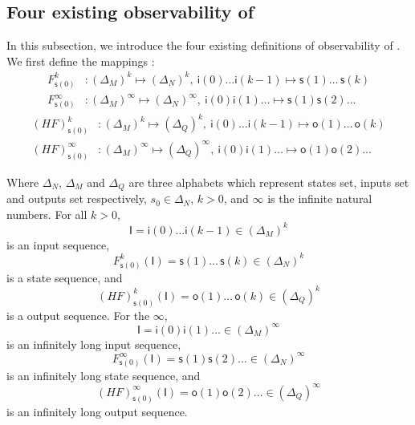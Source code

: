 \subsection{Four existing observability of \BCNs}
In this subsection, we introduce the four existing definitions of observability of \BCNs. %
We first define the mappings \cite{Zhang2016Observability}:
\begin{equation}
\begin{split}
F^k_{\mathsf{s}(0)} &: (\Delta_M)^k\mapsto(\Delta_N)^k,\ \mathsf{i}(0)\ldots \mathsf{i}({k-1}) \mapsto \mathsf{s}(1) \ldots\, \mathsf{s}(k)\\
F^{\infty}_{\mathsf{s}(0)} &: (\Delta_M)^{\infty}\mapsto(\Delta_N)^{\infty},\ \mathsf{i}(0) \mathsf{i}(1) \ldots  \mapsto \mathsf{s}(1) \mathsf{s}(2) \ldots
\end{split}
\label{equ:5}
\end{equation}
\begin{equation}
\begin{split}
(HF)^k_{\mathsf{s}(0)} &: (\Delta_M)^k\mapsto(\Delta_Q)^k,\ \mathsf{i}(0)\ldots \mathsf{i}(k-1) \mapsto \mathsf{o}(1)\ldots\, \mathsf{o}(k)\\
(HF)^{\infty}_{\mathsf{s}(0)} &: (\Delta_M)^{\infty}\mapsto(\Delta_Q)^{\infty},\ \mathsf{i}(0) \mathsf{i}(1) \ldots  \mapsto \mathsf{o}(1) \mathsf{o}(2)\ldots
\end{split}
\label{equ:6}
\end{equation}

Where $\Delta_N$, $\Delta_M$ and $\Delta_Q$ are three alphabets which represent states set, inputs set and outputs set respectively, $s_0\in \Delta_N$, $k>0$, and $\infty$ is the infinite natural numbers. For all  $k>0$,%
\[\mathsf{I}=\mathsf{i}(0)\ldots \mathsf{i}({k-1}) \in(\Delta_M)^k\] 
is an input sequence, 
\[F^k_{\mathsf{s}(0)}(\mathsf{I})=\mathsf{s}(1) \ldots\, \mathsf{s}(k) \in(\Delta_N)^k\]
 is a state sequence, and 
 \[(HF)^k_{\mathsf{s}(0)}(\mathsf{I})=\mathsf{o}(1)\ldots\, \mathsf{o}(k) \in(\Delta_Q)^k\] 
 is a output sequence. For the $\infty$, 
 \[\mathsf{I}=\mathsf{i}(0) \mathsf{i}(1)\ldots  \in(\Delta_M)^{\infty}\] 
 is an infinitely long input sequence, 
 \[F^{\infty}_{\mathsf{s}(0)}(\mathsf{I})=\mathsf{s}(1) \mathsf{s}(2)\ldots  \in(\Delta_N)^{\infty}\] 
 is an infinitely long state sequence, and 
 \[(HF)^{\infty}_{\mathsf{s}(0)}(\mathsf{I})=\mathsf{o}(1) \mathsf{o}(2)\ldots \in(\Delta_Q)^{\infty}\]
  is an infinitely long output sequence. 
  

